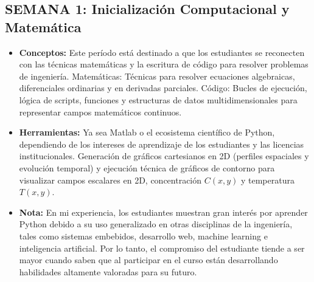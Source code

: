 \subsection{SEMANA 1: Inicialización Computacional y Matemática}
\begin{itemize}
    \item \textbf{Conceptos:} Este período está destinado a que los estudiantes se reconecten con las técnicas matemáticas y la escritura de código para resolver problemas de ingeniería.
Matemáticas: Técnicas para resolver ecuaciones algebraicas, diferenciales ordinarias y en derivadas parciales.
Código: Bucles de ejecución, lógica de scripts, funciones y estructuras de datos multidimensionales para representar campos matemáticos continuos.
\item \textbf{Herramientas:} Ya sea Matlab o el ecosistema científico de Python, dependiendo de los intereses de aprendizaje de los estudiantes y las licencias institucionales.
Generación de gráficos cartesianos en 2D (perfiles espaciales y evolución temporal) y ejecución técnica de {gráficos de contorno} para visualizar campos escalares en 2D, concentración $C(x,y)$ y temperatura $T(x,y)$.
\item \textbf{Nota:} En mi experiencia, los estudiantes muestran gran inter\'es por aprender Python debido a su uso generalizado en otras disciplinas de la ingeniería, tales como sistemas embebidos, desarrollo web, machine learning e inteligencia artificial.
Por lo tanto, el compromiso del estudiante tiende a ser mayor cuando saben que al participar en el curso están desarrollando habilidades altamente valoradas para su futuro.
\end{itemize}

